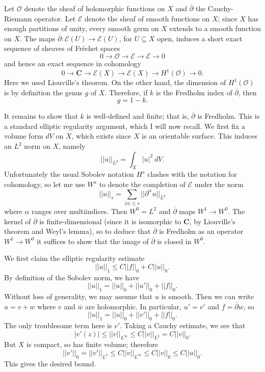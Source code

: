 \documentclass[12pt]{article}
\begin{document}
Let $\mathcal O$ denote the sheaf of holomorphic functions on $X$ and $\overline \partial$ the Cauchy-Riemann operator.
Let $\mathcal E$ denote the sheaf of smooth functions on $X$; since $X$ has enough partitions of unity, every smooth germ on $X$ extends to a smooth function on $X$.
The maps $\overline \partial: \mathcal E(U) \to \mathcal E(U)$, for $U \subseteq X$ open, induces a short exact sequence of sheaves of Fréchet spaces
$$0 \to \mathcal O \to \mathcal E \to \mathcal E \to 0$$
and hence an exact sequence in cohomology
$$0 \to \mathbf C \to \mathcal E(X) \to \mathcal E(X) \to H^1(\mathcal O) \to 0.$$
Here we used Liouville's theorem.
On the other hand, the dimension of $H^1(\mathcal O)$ is by definition the genus $g$ of $X$.
Therefore, if $k$ is the Fredholm index of $\overline \partial$, then
$$g = 1 - k.$$

It remains to show that $k$ is well-defined and finite; that is, $\overline \partial$ is Fredholm.
This is a standard elliptic regularity argument, which I will now recall.
We first fix a volume form $dV$ on $X$, which exists since $X$ is an orientable surface.
This induces an $L^2$ norm on $X$, namely
$$||u||_{L^2} = \int_X |u|^2 ~dV.$$
Unfortunately the usual Sobolev notation $H^s$ clashes with the notation for cohomology, so let me use $W^s$ to denote the completion of $\mathcal E$ under the norm
$$||u||_s = \sum_{|\alpha| \leq s} ||\partial^\alpha u||_{L^2}$$
where $\alpha$ ranges over multiindices.
Then $W^0 = L^2$ and $\overline \partial$ maps $W^1 \to W^0$.
The kernel of $\overline \partial$ is finite-dimensional (since it is isomorphic to $\mathbf C$, by Liouville's theorem and Weyl's lemma), so to deduce that $\overline \partial$ is Fredholm as an operator $W^1 \to W^0$ it suffices to show that the image of $\overline \partial$ is closed in $W^0$.

We first claim the elliptic regularity estimate
$$||u||_1 \leq C ||f||_0 + C ||u||_0.$$
By definition of the Sobolev norm, we have
$$||u||_1 = ||u||_0 + ||u'||_0 + ||f||_0.$$
Without loss of generality, we may assume that $u$ is smooth.
Then we can write $u = v + w$ where $v$ and $\overline w$ are holomorphic.
In particular, $u' = v'$ and $f = \overline \partial w$, so
$$||u||_1 = ||u||_0 + ||v'||_0 + ||f||_0.$$
The only troublesome term here is $v'$.
Taking a Cauchy estimate, we see that
$$|v'(z)| \leq ||v||_{L^\infty} \leq C||v||_{L^2} = C||v||_0.$$
But $X$ is compact, so has finite volume; therefore
$$||v'||_0 = ||v'||_{L^2} \leq C||v||_{L^\infty} \leq C||v||_0 \leq C||u||_0.$$
This gives the desired bound.
\end{document}
